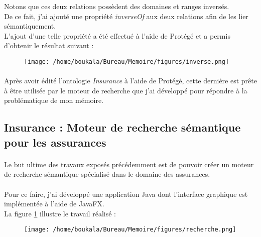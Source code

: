 \documentclass[12pt, a4paper, oneside]{book}
\begin{document}
Notons que ces deux relations possèdent des domaines et ranges inversés.\\

De ce fait, j'ai ajouté une propriété \emph{inverseOf} aux deux relations afin de les lier sémantiquement.\\
L'ajout d'une telle propriété a été effectué à l'aide de Protégé et a permis d'obtenir le résultat suivant : 

\begin{figure}[h!]
\begin{center}
\texttt{[image: /home/boukala/Bureau/Memoire/figures/inverse.png]}
\end{center}
\end{figure}
\paragraph{}
Après avoir édité l'ontologie \emph{Insurance} à l'aide de Protégé, cette dernière est prête à être utilisée par le moteur de recherche que j'ai développé pour répondre à la problématique de mon mémoire.


\subsection{Insurance : Moteur de recherche sémantique pour les assurances}

\paragraph{}

Le but ultime des travaux exposés précédemment est de pouvoir créer un moteur de recherche sémantique spécialisé dans le domaine des assurances. 

\paragraph{}

Pour ce faire, j'ai développé une application Java dont l'interface graphique est implémentée à l'aide de JavaFX.\\

La figure \ref{recherche} illustre le travail réalisé : 

\begin{figure}[h!]
\begin{center}
\texttt{[image: /home/boukala/Bureau/Memoire/figures/recherche.png]}
\label{recherche}
\end{center}
\end{figure}
\end{document}
